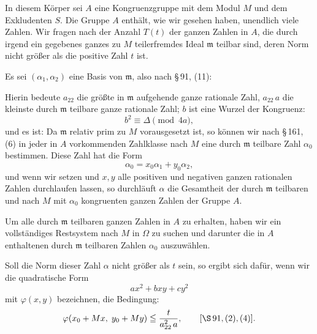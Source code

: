 In diesem Körper sei $A$ eine Kongruenzgruppe mit dem Modul
$M$ und dem Exkludenten $S$. Die Gruppe $A$ enthält, wie wir gesehen
 haben, unendlich viele  Zahlen. Wir fragen nach
der Anzahl $T(t)$ der ganzen Zahlen in $A$, die durch irgend ein
gegebenes ganzes zu $M$ teilerfremdes Ideal $\mathfrak{m}$ teilbar sind, deren
Norm nicht größer als die positive Zahl $t$ ist.

Es sei $(\alpha_1, \alpha_2)$ eine Basis von $\mathfrak{m}$, also nach \S\,91, (11):

Hierin bedeute $a_{22}$ die größte in $\mathfrak{m}$ aufgehende ganze rationale
Zahl, $a_{22}\,a$ die kleinste durch $\mathfrak{m}$ teilbare ganze rationale Zahl;
$b$ ist eine Wurzel der Kongruenz:
\[
b^2 \equiv \Delta \pmod{4a},
\]
und es ist:
Da $\mathfrak{m}$ relativ prim zu $M$ vorausgesetzt ist, so können wir nach
\S\,161, (6) in jeder in $A$ vorkommenden Zahlklasse nach $M$ eine
durch $\mathfrak{m}$ teilbare Zahl $\alpha_0$ bestimmen. Diese Zahl hat die Form
\[
\alpha_0 = x_0\alpha_1 + y_0\alpha_2,
\]
und wenn wir
setzen und $x, y$ alle positiven und negativen ganzen rationalen
Zahlen durchlaufen lassen, so durchläuft $\alpha$ die Gesamtheit der
durch $\mathfrak{m}$ teilbaren und nach $M$ mit $\alpha_0$ kongruenten ganzen Zahlen
der Gruppe $A$.

Um alle durch $\mathfrak{m}$ teilbaren ganzen Zahlen in $A$ zu erhalten,
haben wir ein vollständiges Restsystem nach $M$ in $\Omega$ zu suchen
und darunter die in $A$ enthaltenen durch $\mathfrak{m}$ teilbaren Zahlen $\alpha_0$
auszuwählen.

Soll die Norm dieser Zahl $\alpha$ nicht größer als $t$ sein, so ergibt
 sich dafür, wenn wir die quadratische Form
\[
a x^2 + b x y + c y^2
\]
mit $\varphi(x, y)$ bezeichnen, die Bedingung:
\[
\varphi(x_0 + Mx, \; y_0 + My) \leqq \dfrac{t}{a_{22}^2\,a}, \qquad [\S\,91, (2), (4)].
\]
